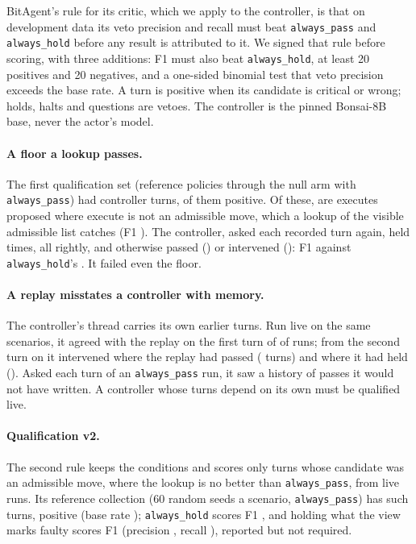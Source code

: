 \documentclass[11pt]{article}
\begin{document}
BitAgent's rule for its critic, which we apply to the controller, is that on development data its veto precision and recall must beat \texttt{always\_pass} and \texttt{always\_hold} before any result is attributed to it. We signed that rule before scoring, with three additions: F1 must also beat \texttt{always\_hold}, at least 20 positives and 20 negatives, and a one-sided binomial test that veto precision exceeds the base rate. A turn is positive when its candidate is critical or wrong; holds, halts and questions are vetoes. The controller is the pinned Bonsai-8B base, never the actor's model.

\paragraph{A floor a lookup passes.} The first qualification set (reference policies through the null arm with \texttt{always\_pass}) had \vOneTurns{} controller turns, \vOnePositives{} of them positive. Of these, \vOneLookupPositives{} are executes proposed where execute is not an admissible move, which a lookup of the visible admissible list catches (F1 \vOneLookupFOne). The controller, asked each recorded turn again, held \vOneHolds{} times, all rightly, and otherwise passed (\vOnePass) or intervened (\vOneIntervene): F1 \vOneModelFOne{} against \texttt{always\_hold}'s \vOneHoldFOne. It failed even the floor.

\paragraph{A replay misstates a controller with memory.} The controller's thread carries its own earlier turns. Run live on the same scenarios, it agreed with the replay on the first turn of \divergeFirstAgree{} of \divergeFirstRuns{} runs; from the second turn on it intervened where the replay had passed (\divergePassToIntervene{} turns) and where it had held (\divergeHoldToIntervene). Asked each turn of an \texttt{always\_pass} run, it saw a history of passes it would not have written. A controller whose turns depend on its own must be qualified live.

\paragraph{Qualification v2.} The second rule keeps the conditions and scores only turns whose candidate was an admissible move, where the lookup is no better than \texttt{always\_pass}, from live runs. Its reference collection (60 random seeds a scenario, \texttt{always\_pass}) has \vTwoRefTurns{} such turns, \vTwoRefPositives{} positive (base rate \vTwoRefBase); \texttt{always\_hold} scores F1 \vTwoRefHoldFOne, and holding what the view marks faulty scores F1 \vTwoRefStateFOne{} (precision \vTwoRefStatePrecision, recall \vTwoRefStateRecall), reported but not required.
\end{document}
